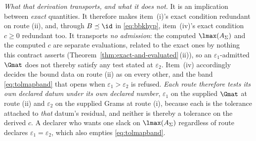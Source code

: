 \begin{remark}
\emph{What that derivation transports, and what it does not.} It is an
implication between \emph{exact} quantities. It therefore makes item~(i)'s
exact condition redundant on route (ii), and, through $B\preceq\id$ in
\eqref{eq:bbkhyp}, item~(iv)'s exact condition $c\ge0$ redundant too. It
transports \emph{no admission}: the computed $\lmax(A_\Sigma)$ and the computed
$c$ are separate evaluations, related to the exact ones by nothing this
contract asserts (Theorem~\ref{thm:exact-and-evaluated}\,(ii)), so an $\varepsilon_1$-admitted
$\Gmat$ does not thereby satisfy any test stated at $\varepsilon_2$. Item~(iv)
accordingly decides the bound data on route (ii) as on every other, and the
band \eqref{eq:tolmapband} that opens when $\varepsilon_1>\varepsilon_2$ is
refused. \emph{Each route therefore tests its own declared datum under its own
declared number}, $\varepsilon_1$ on the supplied $\Gmat$ at route (ii) and
$\varepsilon_2$ on the supplied Grams at route (i), because each is the
tolerance attached to \emph{that} datum's residual, and neither is thereby a
tolerance on the derived $c$. A declarer who wants one slack on
$\lmax(A_\Sigma)$ regardless of route declares
$\varepsilon_1=\varepsilon_2$, which also empties \eqref{eq:tolmapband}.
\end{remark}
